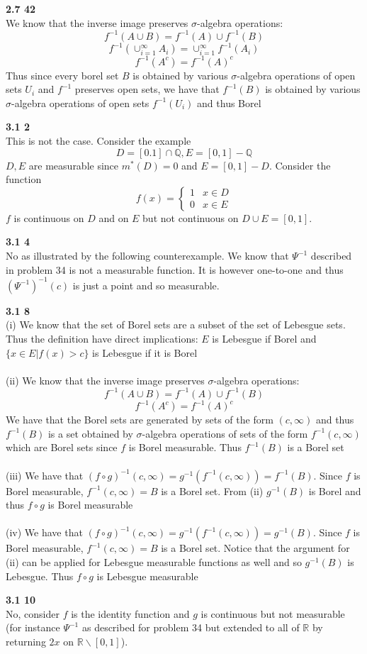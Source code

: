 \documentclass[12pt]{article}
\newenvironment{ques}[1]{\textbf{#1}\vspace{1 mm}\\ }{\bigskip}
\theoremstyle{definition}
\newcommand{\R}{\mathbb R}
\newcommand{\Q}{\mathbb Q}
\renewcommand{\-}{\backslash}
\begin{document}
\begin{ques}{2.7 42}
	We know that the inverse image preserves $\sigma$-algebra operations:
	$$f^{-1}(A \cup B) = f^{-1}(A) \cup f^{-1}(B)$$
	$$f^{-1}(\cup_{i=1}^\infty A_i) = \cup_{i=1}^\infty f^{-1}(A_i)$$
	$$f^{-1}(A^c) = f^{-1}(A)^c$$
	Thus since every borel set $B$ is obtained by various $\sigma$-algebra
	operations of open sets $U_i$ and $f^{-1}$ preserves open sets, we have that
	$f^{-1}(B)$ is obtained by various $\sigma$-algebra operations of open sets
	$f^{-1}(U_i)$ and thus Borel
\end{ques}

\begin{ques}{3.1 2}
	This is not the case. Consider the example
	$$D = [0.1] \cap \Q , E = [0,1] - \Q$$
	$D, E$ are measurable since $m^*(D) = 0$ and $E = [0,1] - D$. Consider the function
	$$f(x) = 
	\begin{cases}
	1 & x \in D\\
	0 & x \in E
	\end{cases}$$
	$f$ is continuous on $D$ and on $E$ but not continuous on $D \cup E =
	[0,1]$. 
\end{ques}

\begin{ques}{3.1 4}
	No as illustrated by the following counterexample. We know that $\Psi^{-1}$
	described in problem 34 is not a measurable function.  It is however one-to-one
	and thus $(\Psi^{-1})^{-1}(c)$ is just a point and so measurable.
\end{ques}

\begin{ques}{3.1 8}
	(i)
	We know that the set of Borel sets are a subset of the set of Lebesgue
	sets. Thus the definition have direct implications: $E$ is Lebesgue if
	Borel and $\{x \in E|f(x) > c\}$ is Lebesgue if it is Borel\\
	\\
	(ii) We know that the inverse image preserves $\sigma$-algebra operations:
	$$f^{-1}(A \cup B) = f^{-1}(A) \cup f^{-1}(B)$$
	$$f^{-1}(A^c) = f^{-1}(A)^c$$
	We have that the Borel sets are generated by sets of the form $(c, \infty)$
	and thus $f^{-1}(B)$ is a set obtained by $\sigma$-algebra operations of
	sets of the form $f^{-1}(c, \infty)$ which are Borel sets since $f$ is
	Borel measurable. Thus $f^{-1}(B)$ is a Borel set\\
	\\
	(iii) We have that $(f \circ g)^{-1}(c, \infty) = g^{-1}(f^{-1}(c, \infty))
	= f^{-1}(B)$. Since $f$ is Borel measurable, $f^{-1}(c, \infty) = B$ is a
	Borel set. From (ii) $g^{-1}(B)$ is Borel and thus $f \circ g$ is Borel
	measurable\\
	\\
	(iv) We have that $(f \circ g)^{-1}(c, \infty) = g^{-1}(f^{-1}(c, \infty))
	= g^{-1}(B)$. Since $f$ is Borel measurable, $f^{-1}(c, \infty) = B$ is a
	Borel set. Notice that the argument for (ii) can be applied for Lebesgue
	measurable functions as well and so $g^{-1}(B)$ is Lebesgue. Thus $f
	\circ g$ is Lebesgue measurable
\end{ques}

\begin{ques}{3.1 10}
	No, consider $f$ is the identity function and $g$ is continuous but not
	measurable (for instance $\Psi^{-1}$ as described for problem 34 but
	extended to all of $\R$ by returning $2x$ on $\R \backslash [0,1]$).
\end{ques}
\end{document}
